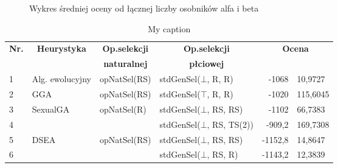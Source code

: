 \documentclass[./FM_mgr.tex]{subfiles}
\begin{document}
\begin{figure}
	\centering
\end{figure}


\begin{figure}
	\caption{Wykres średniej oceny od łącznej liczby osobników alfa i beta \label{figure:knapsack_male_avg}}
	\centering
\end{figure}

\begin{table}[h]
	\centering
	\caption{My caption}
	\label{my-label2}
	\begin{tabular}{|l|l|l|l|r@{$\pm$}l|}
		\hline
		\multicolumn{1}{|c|}{\multirow{2}{*}{{\bf Nr.}}} & \multicolumn{1}{c|}{\multirow{2}{*}{{\bf Heurystyka}}} & \multicolumn{1}{c|}{{\bf Op.selekcji}} & \multicolumn{1}{c|}{{\bf Op.selekcji}} & \multicolumn{2}{c|}{\multirow{2}{*}{{\bf Ocena}}} \\
		& \multicolumn{1}{c|}{}                                  & \multicolumn{1}{c|}{{\bf naturalnej}}    & \multicolumn{1}{c|}{{\bf płciowej}}  & \multicolumn{2}{c|}{}                             \\ \hline \hline
		1 & Alg. ewolucyjny                                         & opNatSel(RS)                           & stdGenSel($\bot$, R, R)                & -1068                   & 10,9727                 \\ \hline
		2 & GGA                                                     & opNatSel(RS)                           & stdGenSel($\top$, R, R)                & -1020                   & 115,6045                \\ \hline
		3 & \multirow{2}{*}{SexualGA}                               & \multirow{2}{*}{opNatSel(R)}           & stdGenSel($\bot$, RS, RS)              & -1102                   & 66,7383                 \\ \cline{1-1}\cline{4-6} 
		4 & &                                        & stdGenSel($\bot$, RS, TS(2))           & -909,2                  & 169,7308                \\ \hline
		5 & \multirow{6}{*}{DSEA}                                   & \multirow{6}{*}{opNatSel(RS)}          & stdGenSel($\bot$, RS, RS)              & -1152,8                 & 14,8647                 \\ \cline{1-1}\cline{4-6} 
		6 & &                                        & stdGenSel($\bot$, RS, R)               & -1143,2                 & 12,3839                 \\ \cline{1-1}\cline{4-6} 

\end{tabular}
\end{table}
\end{document}
